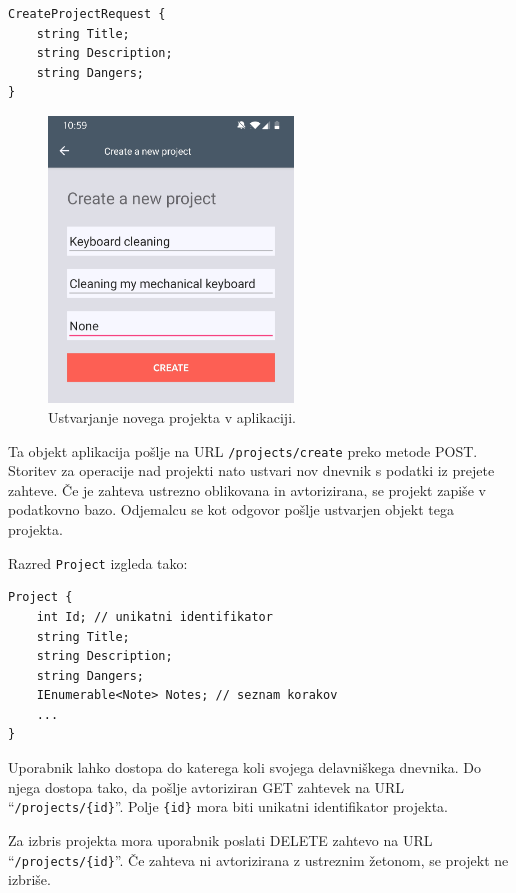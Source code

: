 \documentclass[a4paper, 12pt]{book}
\begin{document}
\begin{verbatim}
CreateProjectRequest { 
    string Title;  
    string Description; 
    string Dangers; 
} 
\end{verbatim}


\begin{figure}[H]
\begin{center}
\includegraphics[width=6.5cm]{app_create_new_small}
\end{center}
	\caption{Ustvarjanje novega projekta v aplikaciji.}
\label{app_create_new}
\end{figure}

\noindent Ta objekt aplikacija pošlje na URL \texttt{/projects/create} preko metode POST.
Storitev za operacije nad projekti nato ustvari nov dnevnik s podatki iz prejete zahteve.
Če je zahteva ustrezno oblikovana in avtorizirana, se projekt zapiše v podatkovno bazo.
Odjemalcu se kot odgovor pošlje ustvarjen objekt tega projekta.

\noindent Razred \texttt{Project} izgleda tako:

\begin{verbatim}
Project { 
    int Id; // unikatni identifikator 
    string Title; 
    string Description; 
    string Dangers; 
    IEnumerable<Note> Notes; // seznam korakov 
    ... 
}
\end{verbatim}

Uporabnik lahko dostopa do katerega koli svojega delavniškega dnevnika.
Do njega dostopa tako, da pošlje avtoriziran GET zahtevek na URL \enquote{\texttt{/projects/\{id\}}}.
Polje \texttt{\{id\}} mora biti unikatni identifikator projekta.

Za izbris projekta mora uporabnik poslati DELETE zahtevo na URL \enquote{\texttt{/projects/\{id\}}}.
Če zahteva ni avtorizirana z ustreznim žetonom, se projekt ne izbriše.
\end{document}
